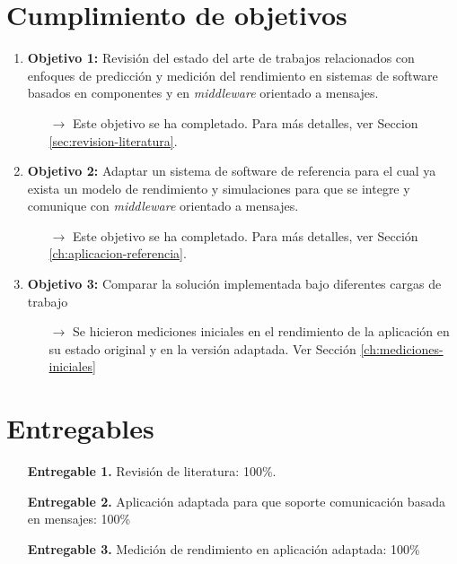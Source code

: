 \documentclass[11pt, twoside]{report}
\begin{document}
\section{Cumplimiento de objetivos}
\begin{enumerate}
    \item \textbf{Objetivo 1:} Revisión del estado del arte de trabajos relacionados con enfoques de predicción y medición del rendimiento en sistemas de software basados en componentes y en \emph{middleware} orientado a mensajes.
    \begin{enumerate}
        \item[$\rightarrow$] Este objetivo se ha completado. Para más detalles, ver Seccion \ref{sec:revision-literatura}.
    \end{enumerate}
    \item \textbf{Objetivo 2:} Adaptar un sistema de software de referencia para el cual ya exista un modelo de rendimiento y simulaciones para que se integre y comunique con \emph{middleware} orientado a mensajes.
    \begin{enumerate}
        \item[$\rightarrow$] Este objetivo se ha completado. Para más detalles, ver Sección \ref{ch:aplicacion-referencia}.
    \end{enumerate}
    \item \textbf{Objetivo 3:} Comparar la solución implementada bajo diferentes cargas de trabajo
    \begin{enumerate}
        \item[$\rightarrow$] Se hicieron mediciones iniciales en el rendimiento de la aplicación en su estado original y en la versión adaptada. Ver Sección \ref{ch:mediciones-iniciales}
    \end{enumerate}
\end{enumerate}



\section{Entregables}
\begin{enumerate}
    \item[] \textbf{Entregable 1.} Revisión de literatura: 100\%.  
    \item[] \textbf{Entregable 2.} Aplicación adaptada para que soporte comunicación basada en mensajes: 100\%
    \item[] \textbf{Entregable 3.} Medición de rendimiento en aplicación adaptada: 100\% 
\end{enumerate}
\end{document}

